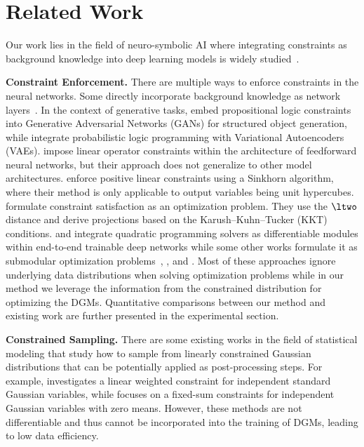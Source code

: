 \section{Related Work}
Our work lies in the field of neuro-symbolic AI where integrating constraints as background knowledge into deep learning models is widely studied~\citep{garcez2023neurosymbolic}. 

\textbf{Constraint Enforcement.}
There are multiple ways to enforce constraints in the neural networks.
Some directly incorporate background knowledge as network layers~\citep{ahmed2022semantic, giunchiglia2021multi}.
In the context of generative tasks, \citet{di2020efficient} embed propositional logic constraints into Generative Adversarial Networks (GANs) for structured object generation, while \citet{misino2022vael} integrate probabilistic logic programming \citep{de2007problog} with Variational Autoencoders (VAEs). 
\citet{Hendriks2020LinearlyCN} impose linear operator constraints within the architecture of feedforward neural networks, but their approach does not generalize to other model architectures. 
\citet{WangICML23} enforce positive linear constraints using a Sinkhorn algorithm, where their method is only applicable to output variables being unit hypercubes. 
\citet{chen2024hard} formulate constraint satisfaction as an optimization problem. They use the $\ltwo$ distance and derive projections based on the Karush–Kuhn–Tucker (KKT) conditions. 
\citet{amos2017optnet} and \citet{donti2017task} integrate quadratic programming solvers as differentiable modules within end-to-end trainable deep networks
while some other works formulate it as submodular optimization problems~\citet{Djolonga2017}, \citet{Tschiatschek2018DifferentiableSM}, and \citet{wilder2019melding}. 
Most of these approaches ignore underlying data distributions when solving optimization problems
while in our method we leverage the information from the constrained distribution for optimizing the DGMs.
Quantitative comparisons between our method and existing work are further presented in the experimental section.



\textbf{Constrained Sampling.}
There are some existing works in the field of statistical modeling that study how to sample from linearly constrained Gaussian distributions that can be potentially applied as post-processing steps.
For example, \citet{risks6030064} investigates a linear weighted constraint for independent standard Gaussian variables, while \citet{LAMBONI2022199} focuses on a fixed-sum constraints for independent Gaussian variables with zero means.
However, these methods are not differentiable and thus cannot be incorporated into the training of DGMs, 
leading to low data efficiency.


